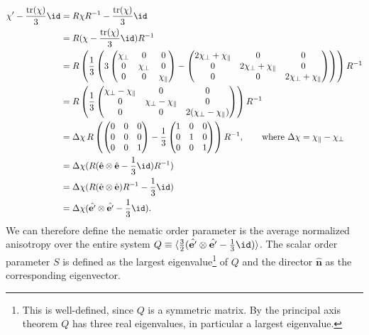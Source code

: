 \begin{align*}
    \chi' - \frac{\mathrm{tr}(\chi)}{3}\id &= R\chi R^{-1} - \frac{\mathrm{tr}(\chi)}{3}\id \\
                                           &= R (\chi - \frac{\mathrm{tr}(\chi)}{3}\id) R^{-1} \\ 
                                           &= R \left(\frac{1}{3}\left(3  
    \begin{pmatrix}
    \chi_\perp&0&0\\
    0&\chi_\perp&0\\
    0&0&\chi_\parallel
    \end{pmatrix}
    -
    \begin{pmatrix}
    2\chi_\perp+\chi_\parallel&0&0\\
    0&2\chi_\perp+\chi_\parallel&0\\
    0&0&2\chi_\perp+\chi_\parallel
    \end{pmatrix}\right)\right)R^{-1}\\
    &= R \left(\frac{1}{3} 
    \begin{pmatrix}
    \chi_\perp-\chi_\parallel&0&0\\
    0&\chi_\perp-\chi_\parallel&0\\
    0&0&2(\chi_\perp-\chi_\parallel)
    \end{pmatrix}
    \right)R^{-1} \\
    &=  \Delta \chi \, R \left( 
    \begin{pmatrix}
    0&0&0\\
    0&0&0\\
    0&0&1
    \end{pmatrix}
    -\frac{1}{3}
    \begin{pmatrix}
    1&0&0\\
    0&1&0\\
    0&0&1
    \end{pmatrix} \right)
    R^{-1},  \qquad \text{where }\Delta \chi= \chi_\parallel - \chi_\perp \\ 
    &= \Delta \chi (R (\hat{\mathbf{e}} \otimes \hat{\mathbf{e}} - \frac{1}{3} \id)R^{-1}) \\
    &= \Delta \chi (R (\hat{\mathbf{e}}\otimes \hat{\mathbf{e}}) R^{-1} - \frac{1}{3} \id) \\
    &= \Delta \chi (\hat{\mathbf{e}'}\otimes \hat{\mathbf{e'}} - \frac{1}{3} \id).
\end{align*}
We can therefore define the nematic order parameter is the average normalized anisotropy over the entire system $Q \equiv \langle \frac{3}{2}(\hat{\mathbf{e}'}\otimes \hat{\mathbf{e'}} - \frac{1}{3} \id )\rangle$. The scalar order parameter $S$ is defined as the largest eigenvalue\footnote{This is well-defined, since $Q$ is a symmetric matrix. By the principal axis theorem $Q$ has three real eigenvalues, in particular a largest eigenvalue.} of $Q$ and the director $\hat{\mathbf{n}}$  as the corresponding eigenvector.
